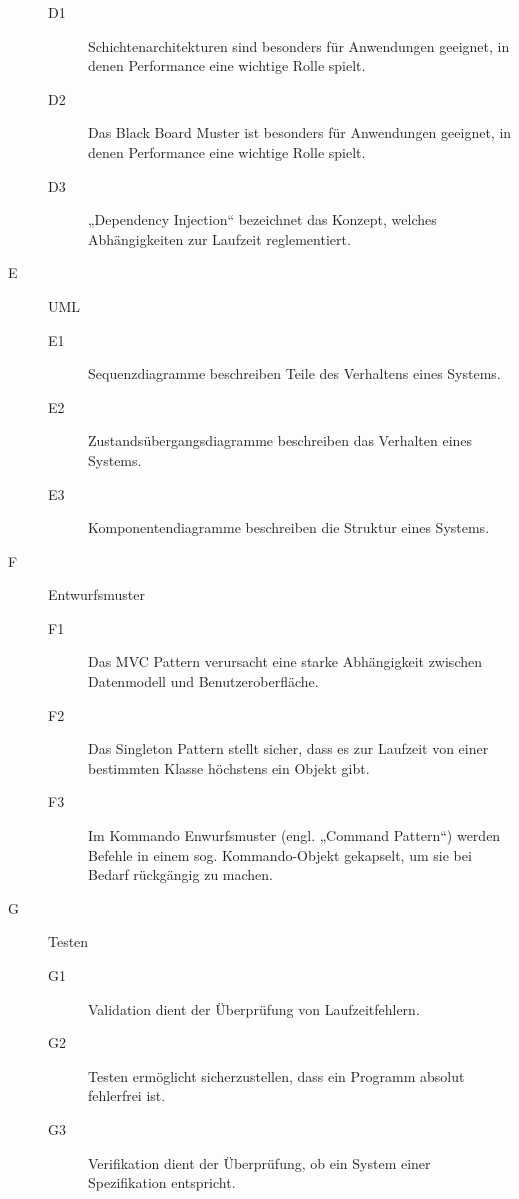 \documentclass{lehramt-informatik}
\begin{document}
\begin{description}
\begin{description}
\item[D1] Schichtenarchitekturen sind besonders für Anwendungen
geeignet, in denen Performance eine wichtige Rolle spielt.

\item[D2] Das Black Board Muster ist besonders für Anwendungen geeignet,
in denen Performance eine wichtige Rolle spielt.

\item[D3] „Dependency Injection“ bezeichnet das Konzept, welches
Abhängigkeiten zur Laufzeit reglementiert.
\end{description}

%

\item[E] UML

\begin{description}
\item[E1] Sequenzdiagramme beschreiben Teile des Verhaltens eines
Systems.

\item[E2] Zustandsübergangsdiagramme beschreiben das Verhalten eines
Systems.

\item[E3] Komponentendiagramme beschreiben die Struktur eines Systems.
\end{description}

%

\item[F] Entwurfsmuster

\begin{description}
\item[F1] Das MVC Pattern verursacht eine starke Abhängigkeit zwischen
Datenmodell und Benutzeroberfläche.

\item[F2] Das Singleton Pattern stellt sicher, dass es zur Laufzeit von
einer bestimmten Klasse höchstens ein Objekt gibt.

\item[F3] Im Kommando Enwurfsmuster (engl. „Command Pattern“) werden
Befehle in einem sog. Kommando-Objekt gekapselt, um sie bei Bedarf
rückgängig zu machen.
\end{description}

%

\item[G] Testen

\begin{description}
\item[G1] Validation dient der Überprüfung von Laufzeitfehlern.

\item[G2] Testen ermöglicht sicherzustellen, dass ein Programm absolut
fehlerfrei ist.

\item[G3] Verifikation dient der Überprüfung, ob ein System einer
Spezifikation entspricht.
\end{description}

\end{description}
\end{document}
